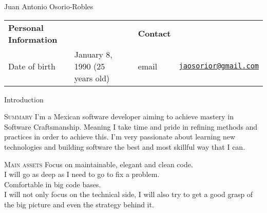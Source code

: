 \documentclass[spanish,10pt,letterpaper]{article}
\begin{document}
\centering
\begin{cv}{Juan Antonio Osorio-Robles}

	\begin{table}[h]
		\begin{tabular}{@{} l l p{0.5cm} l r}
			{\bf Personal Information}	&	&	&	{\bf Contact}	&\\
			Date of birth &	January 8, 1990 (25 years old)	&	&
			email & \href{mailto:jaosorior@gmail.com}{\tt jaosorior@gmail.com}\\
		\end{tabular}
	\end{table}

	\begin{cvlist}{Introduction}
        \item[\textsc{Summary}]
            I'm a Mexican software developer aiming to achieve mastery in
            Software Craftsmanship. Meaning I take time and pride in refining
            methods and practices in order to achieve this. I'm very passionate
            about learning new technologies and building software the best and
            most skillful way that I can.
        \item[\textsc{Main assets}]
            Focus on maintainable, elegant and clean code.\\
            I will go as deep as I need to go to fix a problem.\\
            Comfortable in big code bases.\\
            I will not only focus on the technical side, I will also try to get
            a good grasp of the big picture and even the strategy behind it.
	\end{cvlist}



\end{cv}
\end{document}
